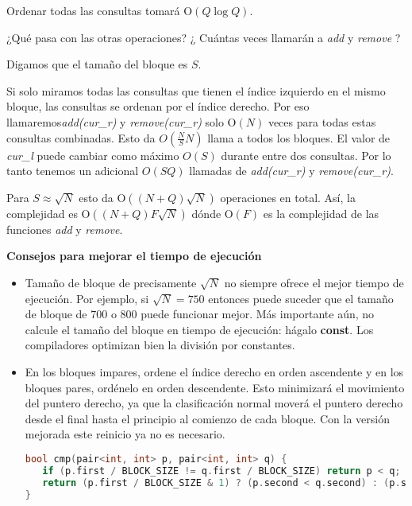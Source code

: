 Ordenar todas las consultas tomará O$(Q\log Q)$.

¿Qué pasa con las otras operaciones? ¿ Cuántas veces llamarán a \emph{add} y \emph{remove} ?

Digamos que el tamaño del bloque es $S$.

Si solo miramos todas las consultas que tienen el índice izquierdo en el mismo bloque, las consultas 
se ordenan por el índice derecho. Por eso llamaremos\emph{add(cur\_r)} y \emph{remove(cur\_r)} solo
O$(N)$ veces para todas estas consultas combinadas. Esto da $O(\frac{N}{S} N)$ llama a todos los
bloques. El valor de \emph{cur\_l} puede cambiar como máximo $O(S)$ durante entre dos consultas. Por
lo tanto tenemos un adicional $O(SQ)$ llamadas de \emph{add(cur\_r)} y \emph{remove(cur\_r)}.

Para $S\approx \sqrt{N}$ esto da O$((N+Q)\sqrt{N})$ operaciones en total. Así, la complejidad es
O$((N+Q)F\sqrt{N})$ dónde O$(F)$ es la complejidad de las funciones \emph{add} y \emph{remove}.


\textbf{Consejos para mejorar el tiempo de ejecución}


\begin{itemize}
	\item Tamaño de bloque de precisamente $\sqrt{N}$ no siempre ofrece el mejor tiempo de ejecución. Por ejemplo, si
	$\sqrt{N}=750$ entonces puede suceder que el tamaño de bloque de $700$ o $800$ puede funcionar mejor. Más importante 
	aún, no calcule el tamaño del bloque en tiempo de ejecución: hágalo \textbf{const}. Los compiladores optimizan bien la división por constantes.
	\item En los bloques impares, ordene el índice derecho en orden ascendente y en los bloques pares, ordénelo en orden descendente. Esto minimizará el movimiento del puntero derecho, ya que la clasificación normal moverá el puntero derecho desde el final hasta el principio al comienzo de cada bloque. Con la versión mejorada este reinicio ya no es necesario.
\begin{lstlisting}[language=C++]
bool cmp(pair<int, int> p, pair<int, int> q) {
   if (p.first / BLOCK_SIZE != q.first / BLOCK_SIZE) return p < q;
   return (p.first / BLOCK_SIZE & 1) ? (p.second < q.second) : (p.second > q.second);
}
\end{lstlisting}
\end{itemize}